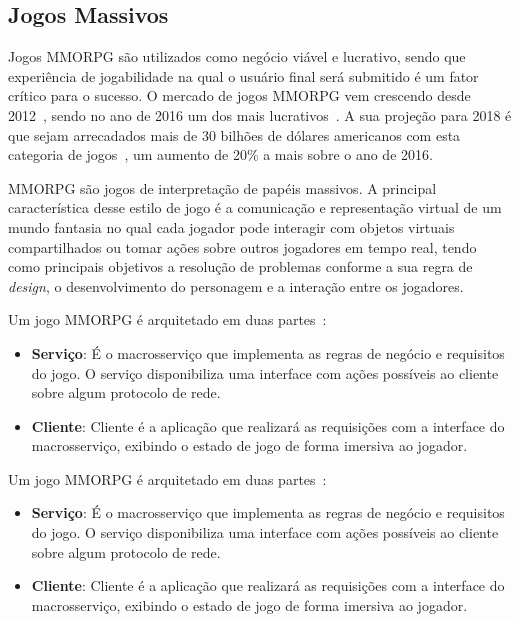 \subsection{Jogos Massivos}

Jogos \ac{MMORPG} são utilizados como negócio viável e lucrativo, sendo que experiência de jogabilidade na qual o usuário final será submitido é um fator crítico para o sucesso.
%
O mercado de jogos \ac{MMORPG} vem crescendo desde 2012~\cite{new_york_times}, sendo no ano de 2016 um dos mais lucrativos~\cite{statista_2016}.
%
A sua projeção para 2018 é que sejam arrecadados mais de 30 bilhões de dólares americanos com esta categoria de jogos~\cite{statista_2018}, um aumento de 20\% a mais sobre o ano de 2016.



\ac{MMORPG} são jogos de interpretação de papéis massivos.
%
A principal característica desse estilo de jogo é a comunicação e representação virtual de um mundo fantasia no qual cada jogador pode interagir com objetos virtuais compartilhados ou tomar ações sobre outros jogadores em tempo real, tendo como principais objetivos a resolução de problemas conforme a sua regra de \textit{design}, o desenvolvimento do personagem e a interação entre os jogadores\cite{video_game_technologies}.
%

Um jogo \ac{MMORPG} é arquitetado em duas partes~\cite{mmo_analytic}:
\begin{itemize}
  \item \textbf{Serviço}: É o macrosserviço que implementa as regras de negócio e requisitos do jogo.
  O serviço disponibiliza uma interface com ações possíveis ao cliente sobre algum protocolo de rede.
  \item \textbf{Cliente}: Cliente é a aplicação que realizará as requisições com a interface do macrosserviço, exibindo o estado de jogo de forma imersiva ao jogador.
\end{itemize}


Um jogo \ac{MMORPG} é arquitetado em duas partes~\cite{mmo_analytic}:
\begin{itemize}
  \item \textbf{Serviço}: É o macrosserviço que implementa as regras de negócio e requisitos do jogo.
  O serviço disponibiliza uma interface com ações possíveis ao cliente sobre algum protocolo de rede.
  \item \textbf{Cliente}: Cliente é a aplicação que realizará as requisições com a interface do macrosserviço, exibindo o estado de jogo de forma imersiva ao jogador.
\end{itemize}


